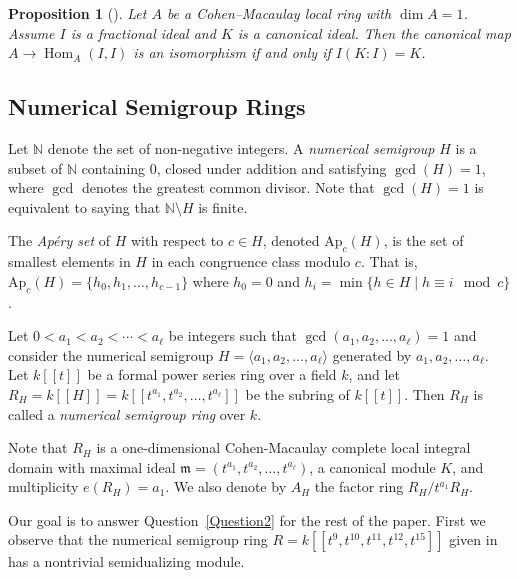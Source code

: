 \documentclass{amsart}
\newcommand{\NN}{\mathbb N}
\newcommand{\m}{\mathfrak{m}}
\DeclareMathOperator{\Hom}{Hom}
\theoremstyle{plain}
\newtheorem{prop}[theorem]{Proposition}
\theoremstyle{definition}
\numberwithin{theorem}{section}
\numberwithin{equation}{section}
\numberwithin{equation}{theorem}
\begin{document}
\begin{prop}[{\cite[Proposition 3.1]{BV}}] \label{p219}
Let $A$ be a Cohen--Macaulay local ring with $\dim A=1$.
Assume $I$ is a fractional ideal and $K$ is a canonical ideal.
Then the canonical map $A \to \Hom_A(I,I)$ is an isomorphism if and only if $I(K:I)=K$.
\end{prop}

\subsection{Numerical Semigroup Rings}

Let $\NN$ denote the set of non-negative integers. A \emph{numerical semigroup} $H$ is a subset of $\NN$ containing 0, closed under addition and satisfying $\gcd(H)=1$, where $\gcd$ denotes the greatest common divisor. Note that $\gcd(H)=1$ is equivalent to saying that $\NN \setminus H$ is finite.

The \emph{Ap\'ery set} of $H$ with respect to $c\in H$, denoted $\mathrm{Ap}_{c}(H)$, is the set of smallest elements in $H$ in each congruence class modulo $c$.
That is, $\mathrm{Ap}_{c}(H)=\{h_0, h_1, \ldots, h_{c-1}\}$ where $h_0=0$ and $h_i=\min \{ h\in H \mid h \equiv i \mod c \}$.

Let $0<a_1<a_2<\cdots< a_{\ell}$ be integers such that $\gcd(a_1, a_2, \ldots, a_{\ell})=1$ and consider the numerical semigroup $H=\langle a_1,a_2,\dots,a_{\ell}\rangle$ generated by $a_1,a_2,\dots,a_{\ell}$.
Let $k[\![t]\!]$ be a formal power series ring over a field $k$, and let $R_H=k[\![H]\!]=k[\![t^{a_1}, t^{a_2}, \ldots, t^{a_{\ell}}]\!]$ be the subring of $k[\![t]\!]$. Then $R_H$ is called a \emph{numerical semigroup ring} over $k$.

Note that $R_H$ is a one-dimensional Cohen-Macaulay complete local integral domain with maximal ideal $\m=(t^{a_1}, t^{a_2}, \ldots, t^{a_{\ell}})$, a canonical module $K$, and multiplicity $e(R_H)=a_1$.
We also denote by $A_H$ the factor ring $R_H/t^{a_1}R_H$.


Our goal is to answer Question~\ref{Question2} for the rest of the paper. First we observe that the numerical semigroup ring $R=k[\![ t^9, t^{10}, t^{11}, t^{12}, t^{15} ]\!]$ given in \cite[Example 7.3]{GTTT} has a nontrivial semidualizing module.
 
\end{document}
